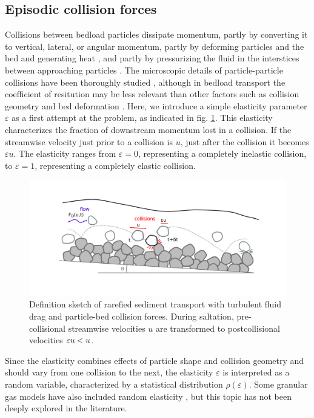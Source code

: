 \subsection{Episodic collision forces}
Collisions between bedload particles dissipate momentum, partly by converting it to vertical, lateral, or angular momentum, partly by deforming particles and the bed and generating heat \citep{Schmeeckle2014,Williams2021}, and partly by pressurizing the fluid in the interstices between approaching particles \citep{Joseph2001,Schmeeckle2001}. 
The microscopic details of particle-particle collisions have been thoroughly studied \citep{Brach1989, Lorenz1997,Montaine2011}, although in bedload transport the coefficient of resitution may be less relevant than other factors such as collision geometry and bed deformation \citep{}. Here, we introduce a simple elasticity parameter $\varepsilon$ as a first attempt at the problem, as indicated in fig. \ref{fig:fig1}. This elasticity characterizes the fraction of downstream momentum lost in a collision. If the streamwise velocity just prior to a collision is $u$, just after the collision it becomes $\varepsilon u$. The elasticity ranges from $\varepsilon=0$, representing a completely inelastic collision, to $\varepsilon=1$, representing a completely elastic collision.
\begin{figure}
	\centerline{\includegraphics{./figures/ch5/Fig1Concept.png}}
	\caption{Definition sketch of rarefied sediment transport with turbulent fluid drag and particle-bed collision forces. During saltation, pre-collisional streamwise velocities $u$ are transformed to postcollisional velocities $\varepsilon u < u$.}
	\label{fig:fig1}
\end{figure}

Since the elasticity combines effects of particle shape and collision geometry and should vary from one collision to the next, the elasticity $\varepsilon$ is interpreted as a random variable, characterized by a statistical distribution $\rho(\varepsilon)$.
Some granular gas models have also included random elasticity \citep[e.g.][]{Serero2015}, but this topic has not been deeply explored in the literature.

